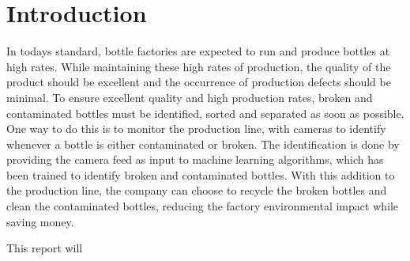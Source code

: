 \section{Introduction}

In todays standard, bottle factories are expected to run and produce bottles at high rates. 
While maintaining these high rates of production, the quality of the product should be excellent and the occurrence of production defects should be minimal.
To ensure excellent quality and high production rates, broken and contaminated bottles must be identified, sorted and separated as soon as possible. 
One way to do this is to monitor the production line, with cameras to identify whenever a bottle is either contaminated or broken. 
The identification is done by providing the camera feed as input to machine learning algorithms, which has been trained to identify broken and contaminated bottles.
With this addition to the production line, the company can choose to recycle the broken bottles and clean the contaminated bottles, reducing the factory environmental impact while saving money.
\par
This report will 